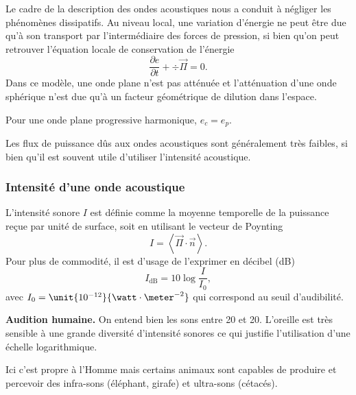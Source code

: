 Le cadre de la description des ondes acoustiques nous a conduit à négliger les phénomènes dissipatifs.
Au niveau local, une variation d'énergie ne peut être due qu'à son transport par l'intermédiaire des forces de pression, si bien qu'on peut retrouver l'équation locale de conservation de l'énergie
\begin{equation}
\frac{\partial e}{\partial t} + \div\overrightarrow{\Pi} = 0.
\end{equation}
Dans ce modèle, une onde plane n'est pas atténuée et l'atténuation d'une onde sphérique n'est due qu'à un facteur géométrique de dilution dans l'espace.
\begin{remarque}
Pour une onde plane progressive harmonique, $e_c = e_p$.
\end{remarque}

\begin{transition}
Les flux de puissance dûs aux ondes acoustiques sont généralement très faibles, si bien qu'il est souvent utile d'utiliser l'intensité acoustique. 
\end{transition}

\subsubsection{Intensité d'une onde acoustique}

L'intensité sonore $I$ est définie comme la moyenne temporelle de la puissance reçue par unité de surface, soit en utilisant le vecteur de Poynting
\begin{equation*}
I = \left\langle \overrightarrow{\Pi}\cdot\overrightarrow{n} \right\rangle.
\end{equation*}
Pour plus de commodité, il est d'usage de l'exprimer en décibel (dB)
\begin{equation}
I_\mathrm{dB} = 10\log\frac{I}{I_0},
\end{equation}
avec $I_0 = \unit{10^{-12}}{\watt\cdot\meter^{-2}}$ qui correspond au seuil d'audibilité.

\begin{slide}
\textbf{Audition humaine.}
On entend bien les sons entre \unit{20}{\hertz} et \unit{20}{\kilo\hertz}.
L'oreille est très sensible à une grande diversité d'intensité sonores ce qui justifie l'utilisation d'une échelle logarithmique.

Ici c'est propre à l'Homme mais certains animaux sont capables de produire et percevoir des infra-sons (éléphant, girafe) et ultra-sons (cétacés).
\end{slide}

